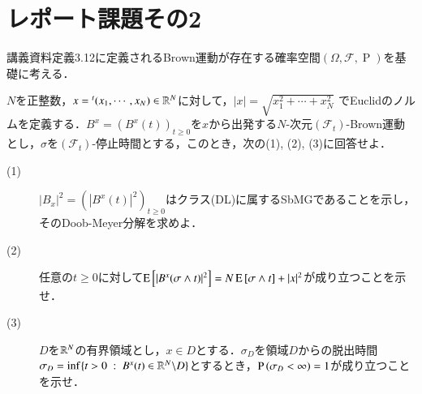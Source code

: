 \section{レポート課題その2}

講義資料定義3.12に定義されるBrown運動が存在する確率空間$(\Omega, \mathcal{F}, \operatorname{P})$を基礎に考える．

$N$を正整数，$x = {}^t(x_1,\cdots,x_N) \in \mathbb{R}^N$に対して，$|x| = \sqrt{x_1^2 + \cdots + x_N^2}$
でEuclidのノルムを定義する．$B^x = \left(B^x(t)\right)_{t \geq 0}$を$x$から出発する$N$-次元$(\mathcal{F}_t)$-Brown運動
とし，$\sigma$を$(\mathcal{F}_t)$-停止時間とする，このとき，次の(1), (2), (3)に回答せよ．
\begin{description}
	\item[(1)] $|B_x|^2 = \left(\left|B^x(t)\right|^2\right)_{t \geq 0}$はクラス(DL)に属するSbMGであることを示し，
		そのDoob-Meyer分解を求めよ．
	\item[(2)] 任意の$t \geq 0$に対して$\operatorname{E} \left[ |B^x(\sigma \wedge t)|^2 \right] = N\operatorname{E} \left[ \sigma \wedge t \right] + |x|^2$が成り立つことを示せ．
	\item[(3)] $D$を$\mathbb{R}^N$の有界領域とし，$x \in D$とする．$\sigma_D$を領域$D$からの脱出時間
		$\sigma_D = \operatorname*{inf}_{} \{ t > 0\ :\ B^x(t) \in \mathbb{R}^N \backslash D \}$とするとき，$\operatorname{P} \left(\sigma_D < \infty\right) = 1$が成り立つことを示せ．
\end{description}

